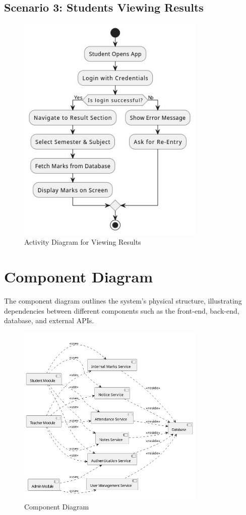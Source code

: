 \subsection{Scenario 3: Students Viewing Results}
\begin{figure}[H]
    \centering
    \includegraphics[width=0.8\textwidth]{Graphics/viewresult.jpg}
    \caption{Activity Diagram for Viewing Results}
    \label{fig:activity_diagram_viewing_results}
\end{figure}

\section{Component Diagram}
The component diagram outlines the system's physical structure, illustrating dependencies between different components such as the front-end, back-end, database, and external APIs.

\begin{figure}[H]
    \centering
    \includegraphics[width=0.8\textwidth]{Graphics/component_diagram.png}
    \caption{Component Diagram}
    \label{fig:component_diagram}
\end{figure}